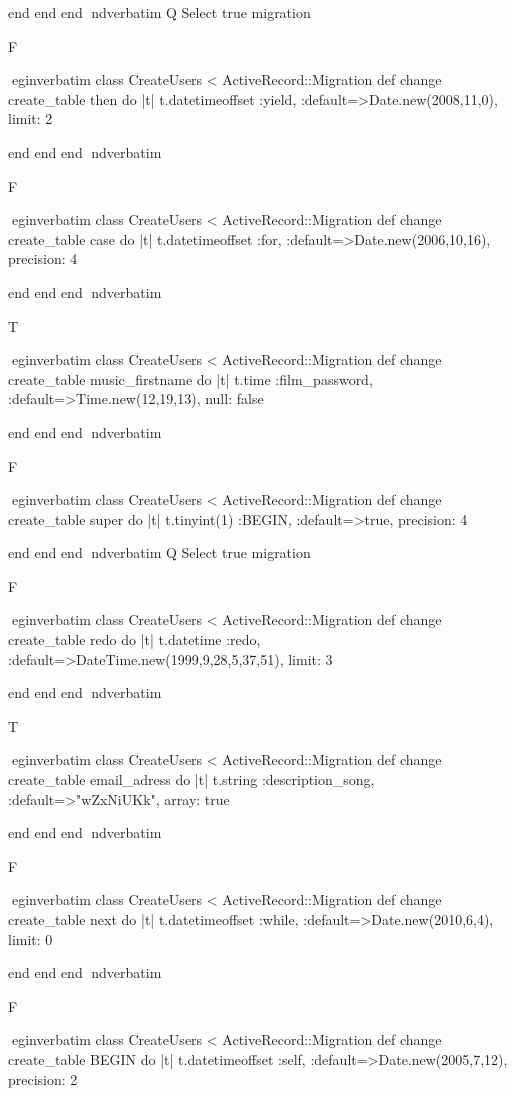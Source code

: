     end 
  end 
end
nd{verbatim}
Q
 Select true migration

F

egin{verbatim}
 class CreateUsers < ActiveRecord::Migration 
  def change 
    create_table then do |t| 
      t.datetimeoffset :yield, :default=>Date.new(2008,11,0), limit: 2
    
    end 
  end 
end
nd{verbatim}

F

egin{verbatim}
 class CreateUsers < ActiveRecord::Migration 
  def change 
    create_table case do |t| 
      t.datetimeoffset :for, :default=>Date.new(2006,10,16), precision: 4
    
    end 
  end 
end
nd{verbatim}

T

egin{verbatim}
 class CreateUsers < ActiveRecord::Migration 
  def change 
    create_table music_firstname do |t| 
      t.time :film_password, :default=>Time.new(12,19,13), null: false
    
    end 
  end 
end
nd{verbatim}

F

egin{verbatim}
 class CreateUsers < ActiveRecord::Migration 
  def change 
    create_table super do |t| 
      t.tinyint(1) :BEGIN, :default=>true, precision: 4
    
    end 
  end 
end
nd{verbatim}
Q
 Select true migration

F

egin{verbatim}
 class CreateUsers < ActiveRecord::Migration 
  def change 
    create_table redo do |t| 
      t.datetime :redo, :default=>DateTime.new(1999,9,28,5,37,51), limit: 3
    
    end 
  end 
end
nd{verbatim}

T

egin{verbatim}
 class CreateUsers < ActiveRecord::Migration 
  def change 
    create_table email_adress do |t| 
      t.string :description_song, :default=>"wZxNiUKk", array: true
    
    end 
  end 
end
nd{verbatim}

F

egin{verbatim}
 class CreateUsers < ActiveRecord::Migration 
  def change 
    create_table next do |t| 
      t.datetimeoffset :while, :default=>Date.new(2010,6,4), limit: 0
    
    end 
  end 
end
nd{verbatim}

F

egin{verbatim}
 class CreateUsers < ActiveRecord::Migration 
  def change 
    create_table BEGIN do |t| 
      t.datetimeoffset :self, :default=>Date.new(2005,7,12), precision: 2
    
